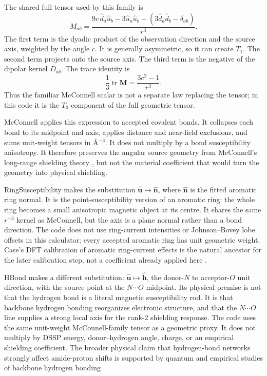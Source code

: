 \documentclass[11pt]{article}
\begin{document}
The shared full tensor used by this family is
\[
  M_{ab}
  =
  \frac{
    9c\,\hat d_a\hat u_b
    -3\hat u_a\hat u_b
    -\left(3\hat d_a\hat d_b-\delta_{ab}\right)}
  {r^3}.
\]
The first term is the dyadic product of the observation direction and the
source axis, weighted by the angle \(c\). It is generally asymmetric, so it can
create \(T_1\). The second term projects onto the source axis. The third term
is the negative of the dipolar kernel \(D_{ab}\). The trace identity is
\[
  \frac{1}{3}\operatorname{tr}\bm M
  =
  \frac{3c^2-1}{r^3}.
\]
Thus the familiar McConnell scalar is not a separate law replacing the tensor;
in this code it is the \(T_0\) component of the full geometric tensor.

McConnell applies this expression to accepted covalent bonds. It collapses each
bond to its midpoint and axis, applies distance and near-field exclusions, and
sums unit-weight tensors in \(\si{\angstrom^{-3}}\). It does not multiply by a
bond susceptibility anisotropy. It therefore preserves the angular source
geometry from McConnell's long-range shielding theory \cite{mcconnell1957}, but
not the material coefficient that would turn the geometry into physical
shielding.

RingSusceptibility makes the substitution
\(\hat{\bm u}\mapsto\hat{\bm n}\), where \(\hat{\bm n}\) is the fitted aromatic
ring normal. It is the point-susceptibility version of an aromatic ring: the
whole ring becomes a small anisotropic magnetic object at its centre. It shares
the same \(r^{-3}\) kernel as McConnell, but the axis is a plane normal rather
than a bond direction. The code does not use ring-current intensities or
Johnson--Bovey lobe offsets in this calculator; every accepted aromatic ring
has unit geometric weight. Case's DFT calibration of aromatic ring-current
effects is the natural ancestor for the later calibration step, not a coefficient
already applied here \cite{case1995}.

HBond makes a different substitution:
\(\hat{\bm u}\mapsto\hat{\bm h}\), the donor-\(N\) to acceptor-\(O\) unit
direction, with the source point at the \(N\cdots O\) midpoint. Its physical
premise is not that the hydrogen bond is a literal magnetic susceptibility
rod. It is that backbone hydrogen bonding reorganizes electronic structure, and
that the \(N\cdots O\) line supplies a strong local axis for the rank-2
shielding response. The code uses the same unit-weight McConnell-family tensor
as a geometric proxy. It does not multiply by DSSP energy, donor--hydrogen
angle, charge, or an empirical shielding coefficient. The broader physical
claim that hydrogen-bond networks strongly affect amide-proton shifts is
supported by quantum and empirical studies of backbone hydrogen bonding
\cite{parker2006,larsen2015}.
\end{document}
